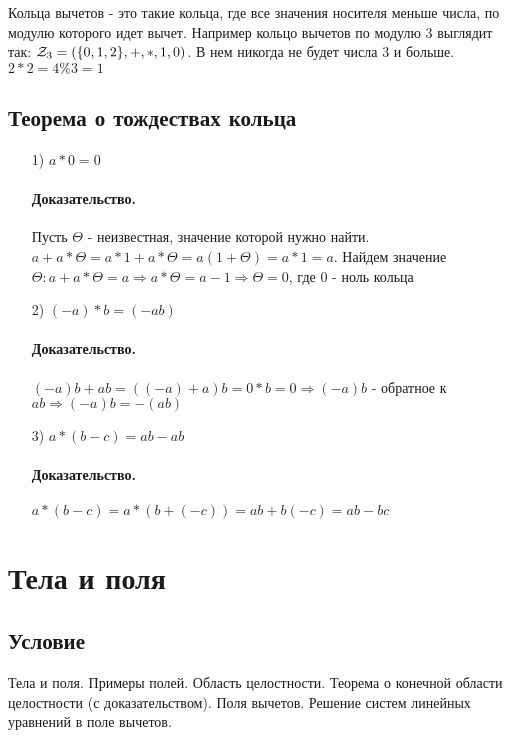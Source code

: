 \documentclass{report}
\begin{document}
\medskip

Кольца вычетов - это такие кольца, где все значения носителя меньше числа, по модулю
которого идет вычет. Например кольцо вычетов по модулю 3 выглядит так: ${\cal Z}_{3} = (\{0,1,2\}, +, *, 1, 0)$.
В нем никогда не будет числа 3 и больше. $2 * 2 = 4 \% 3 = 1$

\medskip

\subsection{Теорема о тождествах кольца}
\begin{itemize}
	\item[1)] $a * 0 = 0$
		\paragraph*{Доказательство.} Пусть $\Theta$ - неизвестная, значение которой нужно найти.\newline
		$a + a * \Theta = a * 1 + a*\Theta = a(1 + \Theta) = a * 1 = a$.\newline
		Найдем значение $\Theta: a + a*\Theta = a \Rightarrow a*\Theta = a - 1 \Rightarrow \Theta = 0$, где 0 - ноль кольца
	\item[2)] $(-a)*b = (-ab)$
		\paragraph*{Доказательство.}
		$(-a)b + ab = ((-a) + a)b = 0 * b = 0 \Rightarrow (-a)b$ - обратное к $ab \Rightarrow (-a)b = -(ab)$
	\item[3)] $a * (b - c) = ab - ab$
		\paragraph*{Доказательство.}
		$a * (b - c) = a * (b + (-c)) = ab + b(-c) = ab - bc$
\end{itemize}

\newpage

\section{Тела и поля}
\subsection{Условие}
Тела и поля. Примеры полей. Область целостности. Теорема о конечной области
целостности (с доказательством). Поля вычетов. Решение систем линейных уравнений
в поле вычетов.
\end{document}
